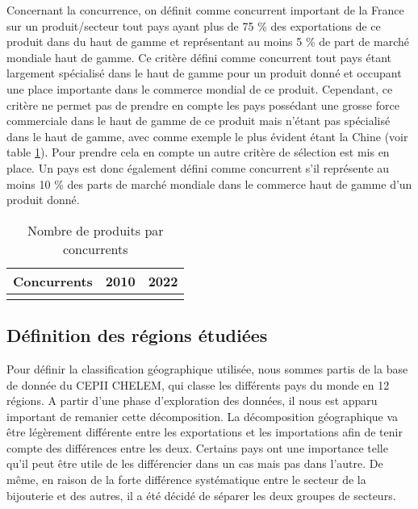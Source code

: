 \documentclass[french,10pt,a4paper]{article}
\begin{document}
Concernant la concurrence, on définit comme concurrent important de la France sur un produit/secteur tout pays ayant plus de 75 \% des exportations de ce produit dans du haut de gamme et représentant au moins 5 \% de part de marché mondiale haut de gamme. Ce critère défini comme concurrent tout pays étant largement spécialisé dans le haut de gamme pour un produit donné et occupant une place importante dans le commerce mondial de ce produit. Cependant, ce critère ne permet pas de prendre en compte les pays possédant une grosse force commerciale dans le haut de gamme de ce produit mais n'étant pas spécialisé dans le haut de gamme, avec comme exemple le plus évident étant la Chine (voir table \ref{tab:nb-product-by-concu}). Pour prendre cela en compte un autre critère de sélection est mis en place. Un pays est donc également défini comme concurrent s'il représente au moins 10 \% des parts de marché mondiale dans le commerce haut de gamme d'un produit donné.

\begin{table}[ht]
  \centering
  \begin{tabular}{lrr}
    \hline
   Concurrents & 2010 & 2022 \\
    \hline
    \\
    \hline
  \end{tabular}
  \caption{Nombre de produits par concurrents}
  \label{tab:nb-product-by-concu}
\end{table}

\subsection{Définition des régions étudiées}

Pour définir la classification géographique utilisée, nous sommes partis de la base de donnée du CEPII CHELEM, qui classe les différents pays du monde en 12 régions. A partir d'une phase d'exploration des données, il nous est apparu important de remanier cette décomposition. La décomposition géographique va être légèrement différente entre les exportations et les importations afin de tenir compte des différences entre les deux. Certains pays ont une importance telle qu'il peut être utile de les différencier dans un cas mais pas dans l'autre. De même, en raison de la forte différence systématique entre le secteur de la bijouterie et des autres, il a été décidé de séparer les deux groupes de secteurs.
\end{document}
